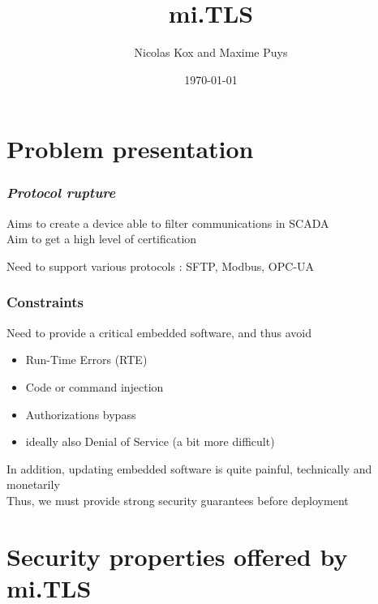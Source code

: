 \documentclass{beamer}
\title{mi.TLS}
\author{Nicolas Kox and Maxime Puys}
\date{\today}
\begin{document}
\begin{frame}
    \maketitle
\end{frame}

\section{Problem presentation}

\begin{frame}
  \frametitle{\emph{Protocol rupture}}

  Aims to create a device able to filter communications in SCADA\\
  Aim to get a high level of certification\\
  \vfill
  
  Need to support various protocols : SFTP, Modbus, OPC-UA\\

\end{frame}



\begin{frame}
  \frametitle{Constraints}

  Need to provide a critical embedded software, and thus avoid 
  
  \begin{itemize}
    \item Run-Time Errors (RTE)
    \item Code or command injection
    \item Authorizations bypass
    \item ideally also Denial of Service (a bit more difficult)
  \end{itemize}

  In addition, updating embedded software is quite painful, technically and monetarily\\
  Thus, we must provide strong security guarantees before deployment

\end{frame}




\section{Security properties offered by mi.TLS}

\begin{frame}
    \tableofcontents[currentsection]
\end{frame}
\end{document}
